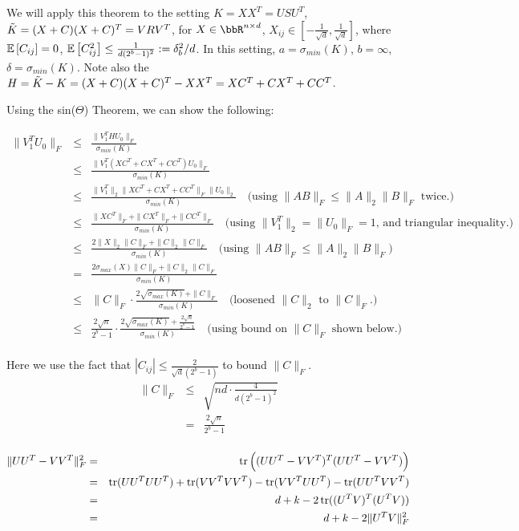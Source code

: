 We will apply this theorem to the setting $K = XX^T = USU^T$, $\tK = (X+C)(X+C)^T = VRV^T$,
for $X \in \RR^{n \times d}$, $X_{ij}\in [-\frac{1}{\sqrt{d}},\frac{1}{\sqrt{d}}]$,
where $\expect{}{C_{ij}} = 0$, $\expect{}{C_{ij}^2} \leq \frac{1}{d(2^b-1)^2} \defeq \delta_b^2/d$.
In this setting, $a=\sigma_{min}(K)$, $b=\infty$, $\delta=\sigma_{min}(K)$.
Note also the $H = \tK-K = (X+C)(X+C)^T - XX^T = XC^T + CX^T + CC^T$.

Using the sin($\Theta$) Theorem, we can show the following:

\begin{eqnarray*}
\|V_1^T U_0\|_F &\leq& \frac{\|V_1^T H U_0\|_F}{\sigma_{min}(K)}\\
&\leq& \frac{\|V_1^T (XC^T + CX^T + CC^T) U_0\|_F}{\sigma_{min}(K)}\\
&\leq& \frac{\|V_1^T\|_2 \|XC^T + CX^T + CC^T\|_F \|U_0\|_2}{\sigma_{min}(K)} \quad \text{(using $\|AB\|_F \leq \|A\|_2 \|B\|_F$ twice.)}\\
&\leq& \frac{\|XC^T\|_F + \|CX^T\|_F + \|CC^T\|_F}{\sigma_{min}(K)} \quad \text{(using $\|V_1^T\|_2 = \|U_0\|_F = 1$, and triangular inequality.)}\\
&\leq& \frac{2\|X\|_2\|C\|_F + \|C\|_2 \|C\|_F}{\sigma_{min}(K)} \quad \text{(using $\|AB\|_F \leq \|A\|_2 \|B\|_F$)}\\
&=& \frac{2\sigma_{max}(X)\|C\|_F + \|C\|_2 \|C\|_F}{\sigma_{min}(K)} \\
&\leq& \|C\|_F \cdot \frac{2\sqrt{\sigma_{max}(K)} + \|C\|_F }{\sigma_{min}(K)}  \quad \text{(loosened $\|C\|_2$ to  $\|C\|_F$.)}\\
&\leq& \frac{2\sqrt{n}}{2^b-1} \cdot \frac{2\sqrt{\sigma_{max}(K)} + \frac{2\sqrt{n}}{2^b-1} }{\sigma_{min}(K)} \quad \text{(using bound on $\|C\|_F$ shown below.)} \\
\end{eqnarray*}

Here we use the fact that $|C_{ij}| \leq \frac{2}{\sqrt{d}(2^b-1)}$ to bound $\|C\|_F$.
\begin{eqnarray*}
\|C\|_F &\leq& \sqrt{nd \cdot \frac{4}{d(2^b-1)^2}} \\
&=& \frac{2\sqrt{n}}{2^b-1} \\
\end{eqnarray*}


\begin{lemma}
\label{lemma1}
\begin{eqnarray*}
	\|UU^T - VV^T \|_F^2 &=& \tr\Big( (UU^T - VV^T)^T (UU^T - VV^T)  \Big)\\
	&=& \tr(UU^TUU^T) + \tr(VV^T VV^T) - \tr(VV^T UU^T) - \tr(UU^T VV^T) \\
	&=& d + k - 2 \tr((U^T V)^T (U^T V)) \\
	&=& d + k - 2 \|U^T V\|_F^2
\end{eqnarray*}
\end{lemma}

